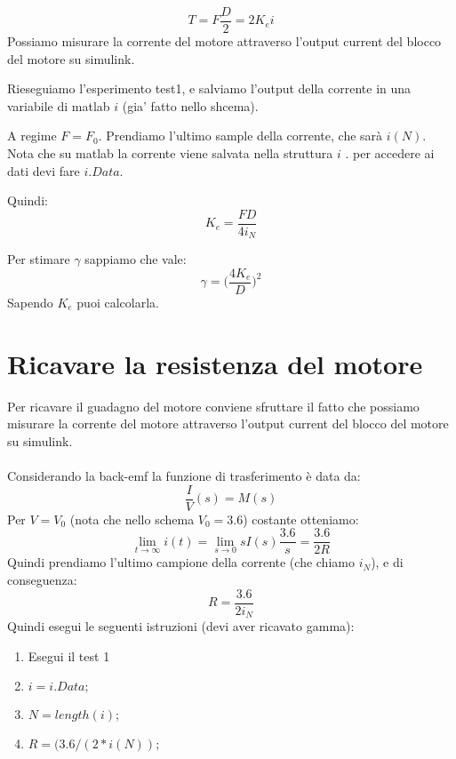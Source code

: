 \documentclass[10pt,a4paper]{article}
\begin{document}
$$T = F\frac{D}{2} = 2K_e i$$
Possiamo misurare la corrente del motore attraverso l'output current del blocco del motore su simulink.

Rieseguiamo l'esperimento test1, e salviamo l'output della corrente in una variabile di matlab $i$ (gia' fatto nello shcema).

A regime $F=F_0$. Prendiamo l'ultimo sample della corrente, che sarà $i(N)$. Nota che su matlab la corrente viene salvata nella struttura $i$ . per accedere ai dati devi fare $i.Data$.

 Quindi:
$$K_e = \frac{FD}{4i_N}$$

Per stimare $\gamma$ sappiamo che vale:
$$\gamma = \Big(\frac{4K_e}{D}\Big)^2$$
Sapendo $K_e$ puoi calcolarla.

\newpage
\section{Ricavare la resistenza del motore}
Per ricavare il guadagno del motore conviene sfruttare il fatto che possiamo misurare la corrente del motore attraverso l'output current del blocco del motore su simulink. \\ \\
Considerando la back-emf la funzione di trasferimento è data da:
$$\frac{I}{V}(s) = M(s)$$
Per $V=V_0$ (nota che nello schema $V_0=3.6$) costante otteniamo:
$$\lim_{t \to \infty} i(t) = \lim_{s \to 0} sI(s)\frac{3.6}{s} = \frac{3.6}{2R}$$
Quindi prendiamo l'ultimo campione della corrente (che chiamo $i_N$), e di conseguenza:
$$R = \frac{3.6}{2i_N}$$
Quindi esegui le seguenti istruzioni (devi aver ricavato gamma):
\begin{enumerate}
\item Esegui il test 1
\item $i=i.Data;$
\item $N=length(i);$
\item $ R = (3.6/(2*i(N));$
\end{enumerate}
\end{document}
